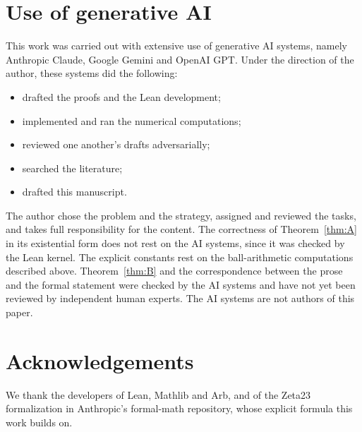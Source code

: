 \documentclass[11pt]{amsart}
\theoremstyle{definition}
\theoremstyle{remark}
\numberwithin{equation}{section}
\begin{document}
\section*{Use of generative AI}
This work was carried out with extensive use of generative AI systems, namely Anthropic Claude, Google Gemini and OpenAI GPT. Under the direction of the author, these systems did the following:
\begin{itemize}
\item drafted the proofs and the Lean development;
\item implemented and ran the numerical computations;
\item reviewed one another's drafts adversarially;
\item searched the literature;
\item drafted this manuscript.
\end{itemize}
The author chose the problem and the strategy, assigned and reviewed the tasks, and takes full responsibility for the content. The correctness of Theorem~\ref{thm:A} in its existential form does not rest on the AI systems, since it was checked by the Lean kernel. The explicit constants rest on the ball-arithmetic computations described above. Theorem~\ref{thm:B} and the correspondence between the prose and the formal statement were checked by the AI systems and have not yet been reviewed by independent human experts. The AI systems are not authors of this paper.

\section*{Acknowledgements}
We thank the developers of Lean, Mathlib and Arb, and of the Zeta23 formalization in Anthropic's formal-math repository, whose explicit formula this work builds on.
\end{document}
